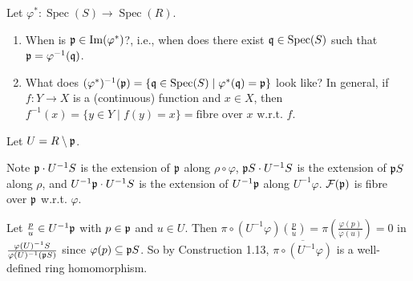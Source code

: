 \begin{question}
    Let $\varphi^*: \operatorname{Spec}(S) \to \operatorname{Spec}(R)$.
    \begin{enumerate}
        \item When is $\mathfrak{p} \in \operatorname{Im}(\varphi^*)$?, i.e., when does there exist $\mathfrak{q} \in \operatorname{Spec}(S)$ such that $\mathfrak{p}  = \varphi^{-1}(\mathfrak{q})$.
        \item What does $(\varphi^*)^{-1}(\mathfrak{p}) = \{\mathfrak{q} \in \operatorname{Spec}(S) \mid \varphi^*(\mathfrak{q}) = \mathfrak{p}\}$ look like? In general, if $f: Y \to X$ is a (continuous) function and $x \in X$, then $f^{-1}(x) = \{y \in Y \mid f(y) = x\} = \text{fibre over $x$ w.r.t. $f$}$.
    \end{enumerate}
\end{question}

\begin{construction}
    Let $U = R \setminus \mathfrak{p}$. 
    \begin{center}
    \end{center}
    Note $\mathfrak{p} \cdot U^{-1}S$ is the extension of $\mathfrak{p}$ along $\rho \circ \varphi$, $\mathfrak{p} S \cdot U^{-1}S$ is the extension of $\mathfrak{p} S$ along $\rho$, and $U^{-1}\mathfrak{p} \cdot U^{-1}S$ is the extension of $U^{-1}\mathfrak{p}$ along $U^{-1}\varphi$. $\mathcal{F}(\mathfrak{p})$ is fibre over $\mathfrak{p}$ w.r.t. $\varphi$. \par 
    Let $\frac{p}{u} \in U^{-1}\mathfrak{p}$ with $p \in \mathfrak{p}$ and $u \in U$. Then $\pi \circ (U^{-1}\varphi)(\frac{p}{u})  = \pi(\frac{\varphi(p)}{\varphi(u)}) = 0$ in $\frac{\varphi(U)^{-1}S}{\varphi(U)^{-1}(\mathfrak{p} S)}$ since $\varphi(p) \subseteq \mathfrak{p} S$. So by Construction 1.13, $\overbar{\pi \circ (U^{-1}\varphi)}$ is a well-defined ring homomorphism.
    \begin{center}

\end{center}
\end{construction}
